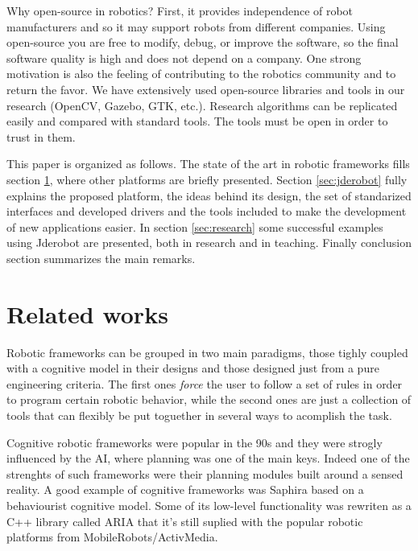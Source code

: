 \documentclass[twocolumn]{svjour3}          %
\begin{document}
Why open-source in robotics? First, it provides independence of robot manufacturers and so it may support robots from different companies. Using open-source you are free to modify, debug, or improve the software, so the final software quality is high and does not depend on a company. One strong motivation is also the feeling of contributing to the robotics community and to return the favor. We have extensively used open-source libraries and tools in our research (OpenCV, Gazebo, GTK, etc.). Research algorithms can be replicated easily and compared with standard tools. The tools must be open in order to trust in them.

This paper is organized as follows. The state of the art in robotic
frameworks fills section \ref{sec:relatedworks}, where other platforms
are briefly presented. Section \ref{sec:jderobot} fully explains the
proposed platform, the ideas behind its design, the set of standarized
interfaces and developed drivers and the tools included to make the
development of new applications easier. In section \ref{sec:research} some successful examples using Jderobot are presented, both in research and in teaching. Finally conclusion section summarizes the main remarks.

\section{Related works}
\label{sec:relatedworks}

Robotic frameworks can be grouped in two main paradigms, those tighly
coupled with a cognitive model in their designs and those designed
just from a pure engineering criteria. The first ones \textit{force}
the user to follow a set of rules in order to program certain robotic
behavior, while the second ones are just a collection of tools that
can flexibly be put toguether in several ways to acomplish the task.

Cognitive robotic frameworks were popular in the 90s and they were
strogly influenced by the AI, where planning was one of the main
keys. Indeed one of the strenghts of such frameworks were their
planning modules built around a sensed reality. A good example of cognitive
frameworks was Saphira \cite{konolige98} based on a behaviourist
cognitive model. Some of its low-level functionality was rewriten as a
C++ library called ARIA \cite{aria} that it's still suplied with the
popular robotic platforms from MobileRobots/ActivMedia.
\end{document}
